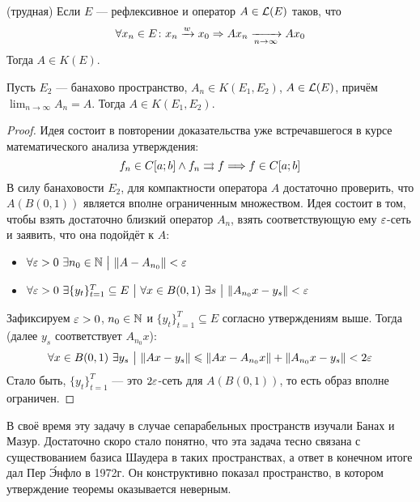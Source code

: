 \begin{task} (трудная)
	Если $E$ --- рефлексивное и оператор $A \in \mathcal{L}(E)$  таков, что
	\[
		\forall x_n \in E \colon x_n \xrightarrow{w} x_0 \Rightarrow Ax_n \xrightarrow[n \to \infty]{} Ax_0
	\]
	Тогда $A \in K(E)$.
\end{task}

\begin{theorem} \label{compact_approx_th}
	Пусть $E_2$ --- банахово пространство, $A_n \in K(E_1, E_2)$, $A \in \mathcal{L}(E)$, причём $\lim_{n \to \infty} A_n = A$. Тогда $A \in K(E_1, E_2)$.
\end{theorem}

\begin{proof}
	Идея состоит в повторении доказательства уже встречавшегося в курсе математического анализа утверждения:
	\[
		f_n \in C[a; b] \wedge f_n \rightrightarrows f \Longrightarrow f \in C[a; b]
	\]
	В силу банаховости $E_2$, для компактности оператора $A$ достаточно проверить, что $A(B(0, 1))$ является вполне ограниченным множеством. Идея состоит в том, чтобы взять достаточно близкий оператор $A_n$, взять соответствующую ему $\varepsilon$-сеть и заявить, что она подойдёт к $A$:
	\begin{itemize}
		\item $\forall \varepsilon > 0\ \exists n_0 \in \mathbb{N} \ \big|\  \|A - A_{n_0}\| < \varepsilon$
		
		\item $\forall \varepsilon > 0\ \exists \{y_t\}_{t = 1}^T \subseteq E \ \big|\  \forall x \in B(0, 1)\ \exists s \ \big|\  \|A_{n_0}x - y_s\| < \varepsilon$
	\end{itemize}
	Зафиксируем $\varepsilon > 0$, $n_0 \in \mathbb{N}$ и $\{y_t\}_{t = 1}^T \subseteq E$ согласно утверждениям выше. Тогда (далее $y_s$ соответствует $A_{n_0}x$):
	\[
		\forall x \in B(0, 1)\ \exists y_s \ \big|\  \|Ax - y_s\| \leqslant \|Ax - A_{n_0}x\| + \|A_{n_0}x - y_s\| < 2\varepsilon
	\]
	Стало быть, $\{y_t\}_{t = 1}^T$ --- это $2\varepsilon$-сеть для $A(B(0, 1))$, то есть образ вполне ограничен.
\end{proof}

\begin{note}
	В своё время эту задачу в случае сепарабельных пространств изучали Банах и Мазур. Достаточно скоро стало понятно, что эта задача тесно связана с существованием базиса Шаудера в таких пространствах, а ответ в конечном итоге дал Пер \'{Э}нфло в 1972г. Он конструктивно показал пространство, в котором утверждение теоремы оказывается неверным.
\end{note}